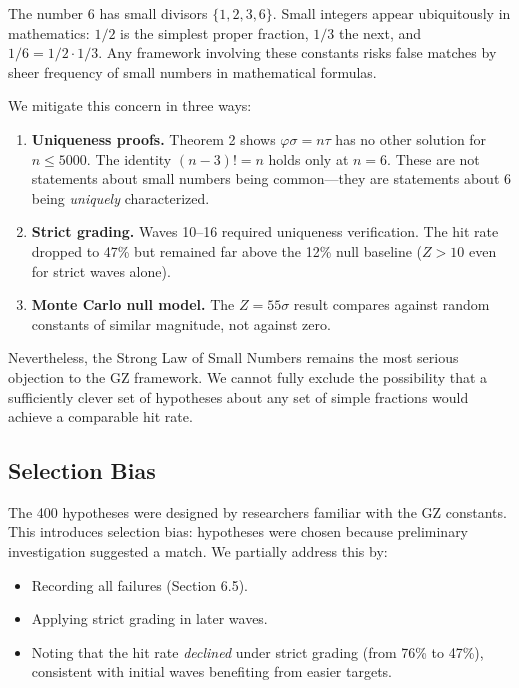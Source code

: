 \documentclass[11pt,a4paper]{article}
\begin{document}
The number 6 has small divisors $\{1, 2, 3, 6\}$. Small integers appear ubiquitously in mathematics: $1/2$ is the simplest proper fraction, $1/3$ the next, and $1/6 = 1/2 \cdot 1/3$. Any framework involving these constants risks false matches by sheer frequency of small numbers in mathematical formulas.

We mitigate this concern in three ways:

\begin{enumerate}
  \item \textbf{Uniqueness proofs.} Theorem 2 shows $\varphi\sigma = n\tau$ has no other solution for $n \leq 5000$. The identity $(n-3)! = n$ holds only at $n = 6$. These are not statements about small numbers being common---they are statements about 6 being \emph{uniquely} characterized.

  \item \textbf{Strict grading.} Waves 10--16 required uniqueness verification. The hit rate dropped to 47\% but remained far above the 12\% null baseline ($Z > 10$ even for strict waves alone).

  \item \textbf{Monte Carlo null model.} The $Z = 55\sigma$ result compares against random constants of similar magnitude, not against zero.
\end{enumerate}

Nevertheless, the Strong Law of Small Numbers remains the most serious objection to the GZ framework. We cannot fully exclude the possibility that a sufficiently clever set of hypotheses about any set of simple fractions would achieve a comparable hit rate.

\subsection{Selection Bias}

The 400 hypotheses were designed by researchers familiar with the GZ constants. This introduces selection bias: hypotheses were chosen because preliminary investigation suggested a match. We partially address this by:

\begin{itemize}
  \item Recording all failures (Section 6.5).
  \item Applying strict grading in later waves.
  \item Noting that the hit rate \emph{declined} under strict grading (from 76\% to 47\%), consistent with initial waves benefiting from easier targets.
\end{itemize}
\end{document}
